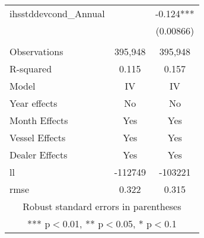 \begin{tabular}{lcc}
ihsstddevcond\_Annual &  & -0.124*** \\
 &  & (0.00866) \\
 &  &  \\
Observations & 395,948 & 395,948 \\
R-squared & 0.115 & 0.157 \\
Model & IV & IV \\
Year effects & No & No \\
Month Effects & Yes & Yes \\
Vessel Effects & Yes & Yes \\
Dealer Effects & Yes & Yes \\
ll & -112749 & -103221 \\
 rmse & 0.322 & 0.315 \\ \hline
\multicolumn{3}{c}{ Robust standard errors in parentheses} \\
\multicolumn{3}{c}{ *** p$<$0.01, ** p$<$0.05, * p$<$0.1} \\
\end{tabular}
